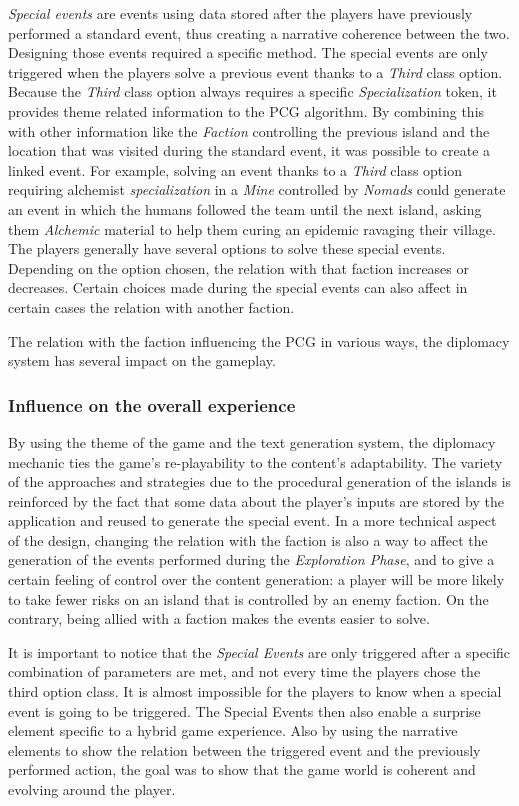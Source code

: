 \textit{Special events} are events using data stored after the players have previously performed a standard event, thus creating a narrative coherence between the two. Designing those events required a specific method. The special events are only triggered when the players solve a previous event thanks to a \textit{Third} class option. Because the \textit{Third} class option always requires a specific \textit{Specialization} token, it provides theme related information to the PCG algorithm. By combining this with other information like the \textit{Faction} controlling the previous island and the location that was visited during the standard event, it was possible to create a linked event. For example, solving an event thanks to a \textit{Third} class option requiring  alchemist \textit{specialization} in a \textit{Mine} controlled by \textit{Nomads} could generate an event in which the humans followed the team until the next island, asking them \textit{Alchemic} material to help them curing an epidemic ravaging their village. The players generally have several options to solve these special events. Depending on the option chosen, the relation with that faction increases or decreases. Certain choices made during the special events can also affect in certain cases the relation with another faction.

The relation with the faction influencing the PCG in various ways, the diplomacy system has several impact on the gameplay. 
\subsubsection{Influence on the overall experience}
By using the theme of the game and the text generation system, the diplomacy mechanic ties the game's re-playability to the content's adaptability. The variety of the approaches and strategies due to the procedural generation of the islands is reinforced by the fact that some data about the player's inputs are stored by the application and reused to generate the special event. 
In a more technical aspect of the design, changing the relation with the faction is also a way to affect the generation of the events performed during the \textit{Exploration Phase}, and to give a certain feeling of control over the content generation: a player will be more likely to take fewer risks on an island that is controlled by an enemy faction. On the contrary, being allied with a faction makes the events easier to solve.

It is important to notice that the \textit{Special Events} are only triggered after a specific combination of parameters are met, and not every time the players chose the third option class. It is almost impossible for the players to know when a special event is going to be triggered. The Special Events then also enable a surprise element specific to a hybrid game experience. Also by using the narrative elements to show the relation between the triggered event and the previously performed action, the goal was to show that the game world is coherent and evolving around the player. 
